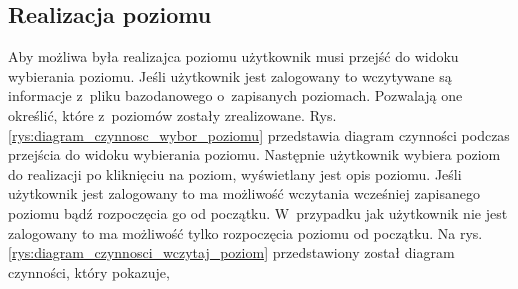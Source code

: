 \documentclass[12pt,a4paper]{article} %
\begin{document}
\subsection{Realizacja poziomu}
\aka Aby możliwa była realizajca poziomu użytkownik musi przejść do widoku wybierania poziomu. Jeśli użytkownik jest zalogowany to wczytywane są informacje z~pliku bazodanowego o~zapisanych poziomach. Pozwalają one określić, które z~poziomów zostały zrealizowane. Rys. \ref{rys:diagram_czynnosc_wybor_poziomu} przedstawia diagram czynności podczas przejścia do widoku wybierania poziomu. Następnie użytkownik wybiera poziom do realizacji po kliknięciu na poziom, wyświetlany jest opis poziomu. Jeśli użytkownik jest zalogowany to ma możliwość wczytania wcześniej zapisanego poziomu bądź rozpoczęcia go od początku. W~przypadku jak użytkownik nie jest zalogowany to ma możliwość tylko rozpoczęcia poziomu od początku. Na rys. \ref{rys:diagram_czynnosci_wczytaj_poziom} przedstawiony został diagram czynności, który pokazuje, 
\end{document}
